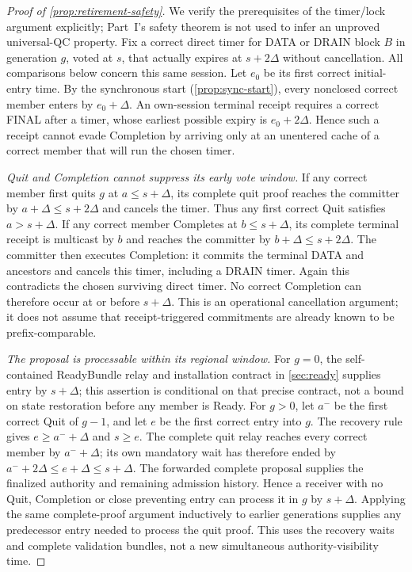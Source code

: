 \documentclass[11pt,a4paper]{article}
\begin{document}
\begin{proof}[Proof of \cref{prop:retirement-safety}]
We verify the prerequisites of the timer/lock argument explicitly;
Part~I's safety theorem is not used to infer an unproved universal-QC property.
Fix a correct direct timer for DATA or DRAIN block $B$ in generation
$g$, voted at $s$, that actually expires at $s+2\Delta$ without
cancellation. All comparisons below concern this same session.
Let $e_0$ be its first correct initial-entry time. By the synchronous
start (\cref{prop:sync-start}), every nonclosed correct member enters by $e_0+\Delta$.
An own-session terminal receipt requires a correct FINAL after a timer,
whose earliest possible expiry is $e_0+2\Delta$. Hence such a receipt
cannot evade Completion by arriving only at an unentered cache of a
correct member that will run the chosen timer.

\emph{Quit and Completion cannot suppress its early vote window.}
If any correct member first quits $g$ at $a\le s+\Delta$, its complete
quit proof reaches the committer by $a+\Delta\le s+2\Delta$ and
cancels the timer. Thus any first correct Quit satisfies
$a>s+\Delta$. If any correct member Completes at $b\le s+\Delta$,
its complete terminal receipt is multicast by $b$ and reaches the
committer by $b+\Delta\le s+2\Delta$. The committer then executes
Completion: it commits the terminal DATA and ancestors and cancels
this timer, including a DRAIN timer. Again this contradicts the chosen
surviving direct timer. No correct Completion can therefore occur at
or before $s+\Delta$. This is an operational cancellation argument;
it does not assume that receipt-triggered commitments are already
known to be prefix-comparable.

\emph{The proposal is processable within its regional window.}
For $g=0$, the self-contained ReadyBundle relay and installation contract
in \cref{sec:ready} supplies entry by $s+\Delta$; this assertion is
conditional on that precise contract, not a bound on state restoration
before any member is Ready. For $g>0$, let $a^-$ be the first correct
Quit of $g-1$, and let $e$ be the first correct entry into $g$.
The recovery rule gives $e\ge a^-+\Delta$ and $s\ge e$.
The complete quit relay reaches every correct member by $a^-+\Delta$;
its own mandatory wait has therefore ended by
$a^-+2\Delta\le e+\Delta\le s+\Delta$. The forwarded complete
proposal supplies the finalized authority and remaining admission
history. Hence a receiver with no Quit, Completion or close preventing
entry can process it in $g$ by $s+\Delta$. Applying the same
complete-proof argument inductively to earlier generations supplies
any predecessor entry needed to process the quit proof. This uses
the recovery waits and complete validation bundles, not a
new simultaneous authority-visibility time.


\end{proof}
\end{document}

